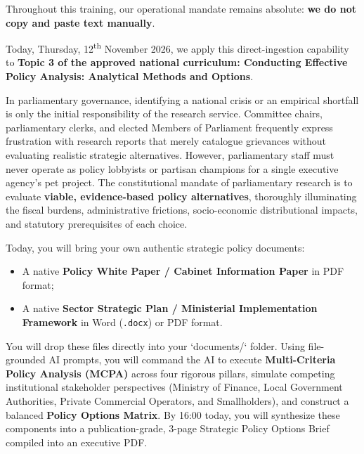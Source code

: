 \documentclass[11pt, a4paper]{report}
\begin{document}
Throughout this training, our operational mandate remains absolute: \textcolor{suagreen}{\textbf{we do not copy and paste text manually}}.

Today, Thursday, 12\textsuperscript{th} November 2026, we apply this direct-ingestion capability to \textcolor{tanzaniablue}{\textbf{Topic 3 of the approved national curriculum: Conducting Effective Policy Analysis: Analytical Methods and Options}}.

In parliamentary governance, identifying a national crisis or an empirical shortfall is only the initial responsibility of the research service. Committee chairs, parliamentary clerks, and elected Members of Parliament frequently express frustration with research reports that merely catalogue grievances without evaluating realistic strategic alternatives. However, parliamentary staff must never operate as policy lobbyists or partisan champions for a single executive agency's pet project. The constitutional mandate of parliamentary research is to evaluate \textcolor{suagreen}{\textbf{viable, evidence-based policy alternatives}}, thoroughly illuminating the fiscal burdens, administrative frictions, socio-economic distributional impacts, and statutory prerequisites of each choice.

Today, you will bring your own authentic strategic policy documents:
\begin{itemize}[label=-]
    \item A native \textcolor{tanzaniablue}{\textbf{Policy White Paper / Cabinet Information Paper}} in PDF format;
    \item A native \textcolor{suagreen}{\textbf{Sector Strategic Plan / Ministerial Implementation Framework}} in Word (\texttt{.docx}) or PDF format.
\end{itemize}

You will drop these files directly into your `documents/` folder. Using file-grounded AI prompts, you will command the AI to execute \textcolor{tanzaniablue}{\textbf{Multi-Criteria Policy Analysis (MCPA)}} across four rigorous pillars, simulate competing institutional stakeholder perspectives (Ministry of Finance, Local Government Authorities, Private Commercial Operators, and Smallholders), and construct a balanced \textcolor{suagreen}{\textbf{Policy Options Matrix}}. By 16:00 today, you will synthesize these components into a publication-grade, 3-page Strategic Policy Options Brief compiled into an executive PDF.
\end{document}

